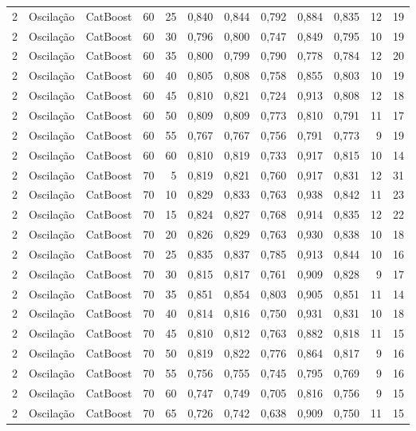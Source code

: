 \begin{longtable}{@{}rllrrrrrrrrr@{}}
2 & Oscilação & CatBoost & 60 & 25 & 0,840 & 0,844 & 0,792 & 0,884 & 0,835 & 12 & 19 \\
2 & Oscilação & CatBoost & 60 & 30 & 0,796 & 0,800 & 0,747 & 0,849 & 0,795 & 10 & 19 \\
2 & Oscilação & CatBoost & 60 & 35 & 0,800 & 0,799 & 0,790 & 0,778 & 0,784 & 12 & 20 \\
2 & Oscilação & CatBoost & 60 & 40 & 0,805 & 0,808 & 0,758 & 0,855 & 0,803 & 10 & 19 \\
2 & Oscilação & CatBoost & 60 & 45 & 0,810 & 0,821 & 0,724 & 0,913 & 0,808 & 12 & 18 \\
2 & Oscilação & CatBoost & 60 & 50 & 0,809 & 0,809 & 0,773 & 0,810 & 0,791 & 11 & 17 \\
2 & Oscilação & CatBoost & 60 & 55 & 0,767 & 0,767 & 0,756 & 0,791 & 0,773 & 9 & 19 \\
2 & Oscilação & CatBoost & 60 & 60 & 0,810 & 0,819 & 0,733 & 0,917 & 0,815 & 10 & 14 \\
2 & Oscilação & CatBoost & 70 & 5 & 0,819 & 0,821 & 0,760 & 0,917 & 0,831 & 12 & 31 \\
2 & Oscilação & CatBoost & 70 & 10 & 0,829 & 0,833 & 0,763 & 0,938 & 0,842 & 11 & 23 \\
2 & Oscilação & CatBoost & 70 & 15 & 0,824 & 0,827 & 0,768 & 0,914 & 0,835 & 12 & 22 \\
2 & Oscilação & CatBoost & 70 & 20 & 0,826 & 0,829 & 0,763 & 0,930 & 0,838 & 10 & 18 \\
2 & Oscilação & CatBoost & 70 & 25 & 0,835 & 0,837 & 0,785 & 0,913 & 0,844 & 10 & 16 \\
2 & Oscilação & CatBoost & 70 & 30 & 0,815 & 0,817 & 0,761 & 0,909 & 0,828 & 9 & 17 \\
2 & Oscilação & CatBoost & 70 & 35 & 0,851 & 0,854 & 0,803 & 0,905 & 0,851 & 11 & 14 \\
2 & Oscilação & CatBoost & 70 & 40 & 0,814 & 0,816 & 0,750 & 0,931 & 0,831 & 10 & 18 \\
2 & Oscilação & CatBoost & 70 & 45 & 0,810 & 0,812 & 0,763 & 0,882 & 0,818 & 11 & 15 \\
2 & Oscilação & CatBoost & 70 & 50 & 0,819 & 0,822 & 0,776 & 0,864 & 0,817 & 9 & 16 \\
2 & Oscilação & CatBoost & 70 & 55 & 0,756 & 0,755 & 0,745 & 0,795 & 0,769 & 9 & 16 \\
2 & Oscilação & CatBoost & 70 & 60 & 0,747 & 0,749 & 0,705 & 0,816 & 0,756 & 9 & 15 \\
2 & Oscilação & CatBoost & 70 & 65 & 0,726 & 0,742 & 0,638 & 0,909 & 0,750 & 11 & 15 \\

\end{longtable}
